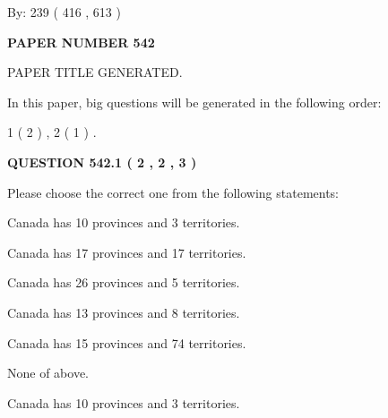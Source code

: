 \documentclass[12pt]{article}
\begin{document}
   
\hspace{1.0in} By: 
 239 ( 416 ,  613 )
   
   
   
   
\newpage 
\setcounter{page}{ 
   542001 } 
   
   
   
   
 {\textbf{ \Large{ PAPER NUMBER  542  }}}
   
   
\vspace{0.2in}
   
   
   
   
   
   
   
   
 \vspace{0.2in}
 
 
 
 
   
   
 PAPER TITLE GENERATED.
   
   
   
\vspace{0.2in}
   
In this paper, big questions will be generated in the following order: 
   
   
   1 ( 2 )
 ,
   2 ( 1 )
 .
  
\vspace{0.2in}
  
{\textbf{\Large{QUESTION
542.1 
 ( 2 , 2 , 3 )
}}}
  
  
Please choose the correct one from the following statements:
 
 
Canada has 10  provinces and 3 territories.
 
 
Canada has  17 provinces and  17 territories.
 
 
Canada has  26 provinces and  5 territories.
 
 
Canada has  13 provinces and  8 territories.
 
 
Canada has  15 provinces and  74 territories.
 
 
 None of above.
 
 
\noindent{}
 
 
Canada has 10  provinces and 3 territories.
 
\end{document}
